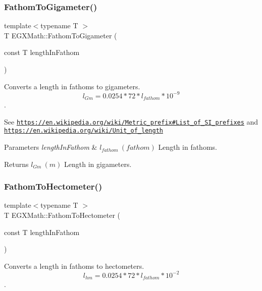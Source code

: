 \subsubsection{\texorpdfstring{Fathom\+To\+Gigameter()}{FathomToGigameter()}}
{\footnotesize\ttfamily template$<$typename T $>$ \\
T E\+G\+X\+Math\+::\+Fathom\+To\+Gigameter (\begin{DoxyParamCaption}\item[{const T}]{length\+In\+Fathom }\end{DoxyParamCaption})}



Converts a length in fathoms to gigameters. \[ l_{Gm}=0.0254 * 72 * l_{fathom} * 10^{-9} \]. 

See \href{https://en.wikipedia.org/wiki/Metric_prefix#List_of_SI_prefixes}{\tt https\+://en.\+wikipedia.\+org/wiki/\+Metric\+\_\+prefix\#\+List\+\_\+of\+\_\+\+S\+I\+\_\+prefixes} and \href{https://en.wikipedia.org/wiki/Unit_of_length}{\tt https\+://en.\+wikipedia.\+org/wiki/\+Unit\+\_\+of\+\_\+length} 
\begin{DoxyParams}{Parameters}
{\em length\+In\+Fathom} & $ l_{fathom}\ (fathom)$ Length in fathoms. \\
\hline
\end{DoxyParams}
\begin{DoxyReturn}{Returns}
$ l_{Gm}\ (m)$ Length in gigameters. 
\end{DoxyReturn}
\mbox{\label{group___e_g_x_math-_conversions-_length_conversions-_imperial-_fathom-_s_i_ga2667f0d80cdd5d547a9a5bc0f1220768}} 
\subsubsection{\texorpdfstring{Fathom\+To\+Hectometer()}{FathomToHectometer()}}
{\footnotesize\ttfamily template$<$typename T $>$ \\
T E\+G\+X\+Math\+::\+Fathom\+To\+Hectometer (\begin{DoxyParamCaption}\item[{const T}]{length\+In\+Fathom }\end{DoxyParamCaption})}



Converts a length in fathoms to hectometers. \[ l_{hm}=0.0254 * 72 * l_{fathom} * 10^{-2} \]. 

